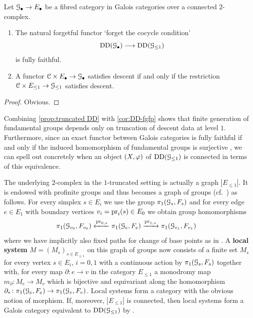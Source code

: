 \begin{prop}
\label{prop:truncated DD}
    Let ${\mathcal G}_\bullet \to E_\bullet$ be a fibred category in Galois categories over a connected $2$-complex.
    \begin{enumerate}
        \item 
        The natural forgetful functor `forget the cocycle condition'
        \[
        \operatorname{DD}({\mathcal G}_\bullet) \longrightarrow \operatorname{DD}({\mathcal G}_{\leq 1})
        \]
        is fully faithful.
        \item
        A functor ${\mathcal C} \times E_\bullet \to {\mathcal G}_\bullet$ satisfies descent if and only if the restriction ${\mathcal C} \times E_{\leq 1} \to {\mathcal G}_{\leq 1}$ satisfies descent.
    \end{enumerate}
\end{prop}
\begin{proof}
    Obvious.
\end{proof}

Combining \cref{prop:truncated DD} with \cref{cor:DD-fgfp} shows that finite generation of fundamental groups depends only on truncation of descent data at level $1$. Furthermore, since an exact functor between Galois categories is fully faithful if and only if the induced homomorphism of fundamental groups is surjective \cite[V Proposition~6.9]{SGA1}, we can spell out concretely when an object $(X,\varphi)$ of $\operatorname{DD}({\mathcal G}_{\leq 1})$ is connected in terms of this equivalence. 

The underlying $2$-complex in the $1$-truncated setting is actually a graph $|E_{\leq 1}|$. It is endowed with profinite groups and thus becomes a graph of groups (cf.\ \cite[I.4.4 Definition 8]{Serre:trees}) as follows. For every simplex $s \in E_i$ we use the group $\pi_1({\mathcal G}_s,F_s)$ and for every edge $e \in E_1$ with boundary vertices $v_i = \operatorname{pr}_i(s) \in E_0$ we obtain group homomorphisms
\[
\pi_1({\mathcal G}_{v_0},F_{v_0}) \xleftarrow{\operatorname{pr}_{0,\ast}} 
\pi_1({\mathcal G}_e,F_e)
\xrightarrow{\operatorname{pr}_{1,\ast}} \pi_1({\mathcal G}_{v_1},F_{v_1}) 
\]
where we have implicitly also fixed paths for change of base points as in . A \textbf{local system} $M = (M_s)_{s \in E_{\leq 1}}$ on this graph of groups now consists of a finite set $M_s$ for every vertex $s \in E_i$, $i=0,1$ with a continuous action by $\pi_1({\mathcal G}_s,F_s)$ together with, for every map $\partial \colon e \to v$ in the category $E_{\leq 1}$ a monodromy map $m_{\partial} \colon M_e \to M_v$ which is bijective and equivariant along the homomorphism $\partial_\ast \colon \pi_1({\mathcal G}_e,F_e) \to \pi_1({\mathcal G}_v,F_v)$. Local systems form a category with the obvious notion of morphism. If, moreover, $|E_{\leq 1}|$ is connected, then local systems form a Galois category equivalent to $\operatorname{DD}({\mathcal G}_{\leq 1})$ by \cite[Proposition~4.4]{Stix2006:vanKampen}. 

